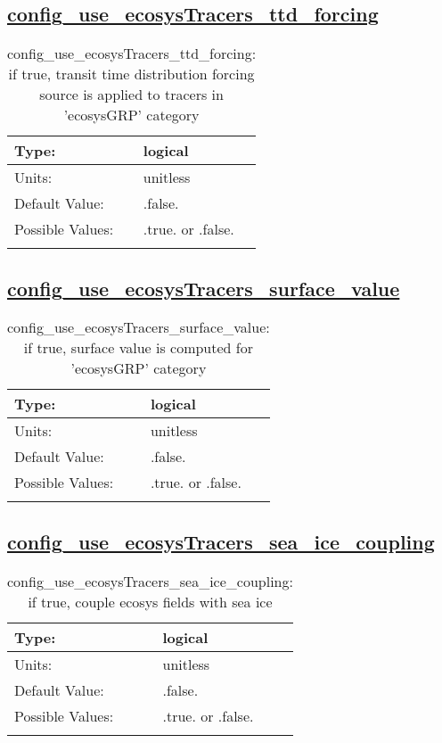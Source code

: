 \subsection[config\_use\_ecosysTracers\_ttd\_forcing]{\hyperref[sec:nm_tab_tracer_forcing_ecosysTracers]{config\_use\_ecosysTracers\_ttd\_forcing}}
\label{subsec:nm_sec_config_use_ecosysTracers_ttd_forcing}
\begin{center}
\begin{longtable}{| p{2.0in} || p{4.0in} |}
    \hline
    Type: & logical \\
    \hline
    Units: & \si{unitless} \\
    \hline
    Default Value: & .false. \\
    \hline
    Possible Values: & .true. or .false. \\
    \hline
    \caption{config\_use\_ecosysTracers\_ttd\_forcing: if true, transit time distribution forcing source is applied to tracers in 'ecosysGRP' category}
\end{longtable}
\end{center}
\subsection[config\_use\_ecosysTracers\_surface\_value]{\hyperref[sec:nm_tab_tracer_forcing_ecosysTracers]{config\_use\_ecosysTracers\_surface\_value}}
\label{subsec:nm_sec_config_use_ecosysTracers_surface_value}
\begin{center}
\begin{longtable}{| p{2.0in} || p{4.0in} |}
    \hline
    Type: & logical \\
    \hline
    Units: & \si{unitless} \\
    \hline
    Default Value: & .false. \\
    \hline
    Possible Values: & .true. or .false. \\
    \hline
    \caption{config\_use\_ecosysTracers\_surface\_value: if true, surface value is computed for 'ecosysGRP' category}
\end{longtable}
\end{center}
\subsection[config\_use\_ecosysTracers\_sea\_ice\_coupling]{\hyperref[sec:nm_tab_tracer_forcing_ecosysTracers]{config\_use\_ecosysTracers\_sea\_ice\_coupling}}
\label{subsec:nm_sec_config_use_ecosysTracers_sea_ice_coupling}
\begin{center}
\begin{longtable}{| p{2.0in} || p{4.0in} |}
    \hline
    Type: & logical \\
    \hline
    Units: & \si{unitless} \\
    \hline
    Default Value: & .false. \\
    \hline
    Possible Values: & .true. or .false. \\
    \hline
    \caption{config\_use\_ecosysTracers\_sea\_ice\_coupling: if true, couple ecosys fields with sea ice}
\end{longtable}
\end{center}
